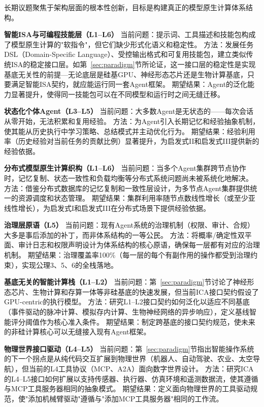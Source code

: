 长期议题聚焦于架构层面的根本性创新，目标是构建真正的模型原生计算体系结构。

\textbf{智能ISA与可编程技能层（L1--L6）}
当前问题：提示词、工具描述和技能包构成了模型原生计算的"软指令"，但它们缺少形式化语义和稳定性。
方法：发展任务DSL（Domain-Specific Language）、受控输出格式和可复用技能包，建立类似传统ISA的稳定接口层。如第~\ref{sec:paradigm}节所论证，这一接口层的稳定性是实现基底无关性的前提---无论底层是硅基GPU、神经形态芯片还是生物计算基底，只要满足智能ISA契约，就应能运行同一套Agent框架。
期望结果：Agent的泛化能力显著提升，使得同一技能包可以在不同模型和运行时之间无缝迁移。

\textbf{状态化个体Agent（L3--L5）}
当前问题：大多数Agent是无状态的——每次会话从零开始，无法积累和复用经验。
方法：为Agent引入长期记忆和经验抽象机制，使其能从历史执行中学习策略、总结模式并主动优化行为\cite{amem2025,agentmemorysurvey2025}。
期望结果：经验利用率（历史经验对当前任务的贡献比例）显著提升，为启发式II和启发式III提供新的经验依据。

\textbf{分布式模型原生计算织构（L1--L6）}
当前问题：当多个Agent集群跨节点协作时，记忆复制、状态一致性和负载均衡等分布式系统问题尚未被系统化地解决。
方法：借鉴分布式数据库的记忆复制和一致性层设计\cite{spanner2012,raft2014}，为多节点Agent集群提供统一的资源调度和状态管理。
期望结果：集群利用率随节点数线性增长（或至少亚线性增长），为启发式I和启发式III在分布式场景下提供经验依据。

\textbf{治理层原语（L5）}
当前问题：现有Agent系统的治理机制（权限、审计、合规）大多是事后添加的补丁，而非体系结构的一等公民。
方法：将概率/确定性双平面、审计日志和权限声明设计为体系结构的核心原语\cite{arbiteros2025,ironclaw2025}，确保每一层都有对应的治理机制。
期望结果：治理覆盖率100\%（每一层的每个有副作用的操作都受到治理约束），实现公理3、5、6的全栈落地。

\textbf{基底无关的智能计算栈（L1--L2）}
当前问题：第~\ref{sec:paradigm}节讨论了神经形态芯片、生物计算和存算一体等非硅基底的快速发展，但当前ICA接口契约假设了GPU-centric的执行模型。
方法：研究L1--L2接口契约如何泛化以适应不同基底（事件驱动的脉冲计算、模拟存内计算、生物神经网络的异步响应），定义基线智能评分阈值作为核心准入条件。
期望结果：制定跨基底的接口契约规范，使未来的非硅计算核心可以无缝接入现有Agent框架。

\textbf{物理世界接口驱动（L4--L5）}
当前问题：第~\ref{sec:paradigm}节指出智能操作系统的下一个拐点是从纯代码交互扩展到物理世界（机器人、自动驾驶、农业、太空导航），但当前的L4工具协议（MCP、A2A）面向数字世界设计。
方法：研究ICA的L4--L5接口如何扩展以支持传感器、执行器、仿真环境和遥测数据流，使其遵循与MCP工具服务器相同的抽象模式。
期望结果：定义面向物理世界的工具驱动规范，使"添加机械臂驱动"遵循与"添加MCP工具服务器"相同的工作流。

